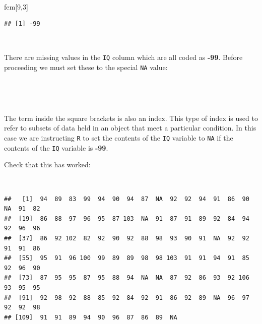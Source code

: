 \documentclass[
  12pt,
]{book}
\newenvironment{Shaded}{\begin{snugshade}}{\end{snugshade}}
\newcommand{\ConstantTok}[1]{\textcolor[rgb]{0.00,0.00,0.00}{#1}}
\newcommand{\DecValTok}[1]{\textcolor[rgb]{0.00,0.00,0.81}{#1}}
\newcommand{\NormalTok}[1]{#1}
\newcommand{\OtherTok}[1]{\textcolor[rgb]{0.56,0.35,0.01}{#1}}
\newcommand{\SpecialCharTok}[1]{\textcolor[rgb]{0.00,0.00,0.00}{#1}}
\begin{document}
~

\begin{Shaded}
\begin{Highlighting}[]
\NormalTok{fem[}\DecValTok{9}\NormalTok{,}\DecValTok{3}\NormalTok{]}
\end{Highlighting}
\end{Shaded}

\begin{verbatim}
## [1] -99
\end{verbatim}

~

There are missing values in the \texttt{IQ} column which are all coded as \textbf{-99}. Before proceeding we must set these to
the special \texttt{NA} value:

~

\begin{Shaded}
\end{Shaded}

~

The term inside the square brackets is also an index. This type of index is used to refer to subsets of data held in an object that meet a particular condition. In this case we are instructing \texttt{R} to set the contents of the \texttt{IQ} variable to \texttt{NA} if the contents of the \texttt{IQ} variable is \textbf{-99}.

\newpage

Check that this has worked:

~

\begin{Shaded}
\end{Shaded}

\begin{verbatim}
##   [1]  94  89  83  99  94  90  94  87  NA  92  92  94  91  86  90  NA  91  82
##  [19]  86  88  97  96  95  87 103  NA  91  87  91  89  92  84  94  92  96  96
##  [37]  86  92 102  82  92  90  92  88  98  93  90  91  NA  92  92  91  91  86
##  [55]  95  91  96 100  99  89  89  98  98 103  91  91  94  91  85  92  96  90
##  [73]  87  95  95  87  95  88  94  NA  NA  87  92  86  93  92 106  93  95  95
##  [91]  92  98  92  88  85  92  84  92  91  86  92  89  NA  96  97  92  92  98
## [109]  91  91  89  94  90  96  87  86  89  NA
\end{verbatim}
\end{document}
